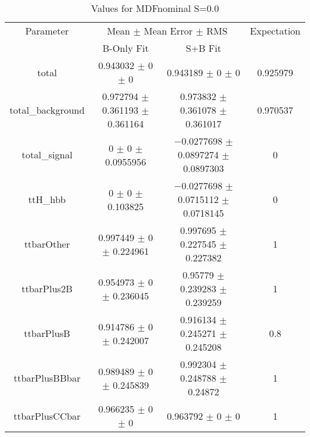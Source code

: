 \begin{table}
\centering
\caption{Values for MDFnominal S=0.0}
\begin{tabular}{cccc}
\toprule
Parameter & \multicolumn{2}{c}{Mean $\pm$ Mean Error $\pm$ RMS} & Expectation\\
 & B-Only Fit & S+B Fit & \\
\midrule
total & \num{0.943032} $\pm$ \num{0} $\pm$ \num{0} & \num{0.943189} $\pm$ \num{0} $\pm$ \num{0} & \num{0.925979}\\
total\_background & \num{0.972794} $\pm$ \num{0.361193} $\pm$ \num{0.361164} & \num{0.973832} $\pm$ \num{0.361078} $\pm$ \num{0.361017} & \num{0.970537}\\
total\_signal & \num{0} $\pm$ \num{0} $\pm$ \num{0.0955956} & \num{-0.0277698} $\pm$ \num{0.0897274} $\pm$ \num{0.0897303} & \num{0}\\
ttH\_hbb & \num{0} $\pm$ \num{0} $\pm$ \num{0.103825} & \num{-0.0277698} $\pm$ \num{0.0715112} $\pm$ \num{0.0718145} & \num{0}\\
ttbarOther & \num{0.997449} $\pm$ \num{0} $\pm$ \num{0.224961} & \num{0.997695} $\pm$ \num{0.227545} $\pm$ \num{0.227382} & \num{1}\\
ttbarPlus2B & \num{0.954973} $\pm$ \num{0} $\pm$ \num{0.236045} & \num{0.95779} $\pm$ \num{0.239283} $\pm$ \num{0.239259} & \num{1}\\
ttbarPlusB & \num{0.914786} $\pm$ \num{0} $\pm$ \num{0.242007} & \num{0.916134} $\pm$ \num{0.245271} $\pm$ \num{0.245208} & \num{0.8}\\
ttbarPlusBBbar & \num{0.989489} $\pm$ \num{0} $\pm$ \num{0.245839} & \num{0.992304} $\pm$ \num{0.248788} $\pm$ \num{0.24872} & \num{1}\\
ttbarPlusCCbar & \num{0.966235} $\pm$ \num{0} $\pm$ \num{0} & \num{0.963792} $\pm$ \num{0} $\pm$ \num{0} & \num{1}\\
\bottomrule
\end{tabular}
\end{table}